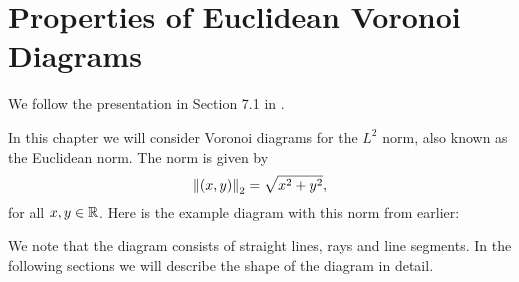 \chapter{Properties of Euclidean Voronoi Diagrams}

We follow the presentation in Section 7.1 in \cite{CompGeo}.

%
%
In this chapter we will consider Voronoi diagrams for the $L^2$ norm, also known as the Euclidean norm. The norm is given by
\[
    \left\lVert (x, y) \right\rVert_2 = \sqrt{x^2 + y^2},
\]
for all $x, y \in \mathbb{R}$. Here is the example diagram with this norm from earlier:
\begin{figure}[H]
    \centering
\end{figure}
We note that the diagram consists of straight lines, rays and line segments. In the following sections we will describe the shape of the diagram in detail.

%
%

